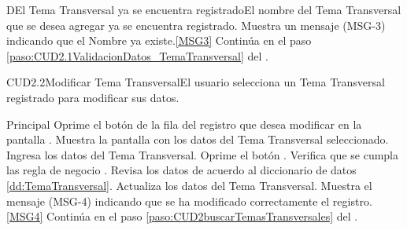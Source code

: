 		\begin{UCtrayectoriaA}{D}{El Tema Transversal ya se encuentra registrado}{El nombre del Tema Transversal que se desea agregar ya se encuentra registrado.}
			\UCpaso Muestra un mensaje (MSG-3) indicando que el Nombre ya existe.\ref{MSG3}
			\UCpaso Continúa en el paso \ref{paso:CUD2.1ValidacionDatos_TemaTransversal} del .
		\end{UCtrayectoriaA}


	\begin{UseCase}{CUD2.2}{Modificar Tema Transversal}{El usuario selecciona un Tema Transversal registrado para modificar sus datos.}
	\end{UseCase}

	\begin{UCtrayectoria}{Principal}			
			\UCpaso[\UCactor] Oprime el botón  de la fila del registro que desea modificar en la pantalla .	
			\UCpaso Muestra la pantalla  con los datos del Tema Transversal seleccionado.
                        \UCpaso [\UCactor] Ingresa los datos del Tema Transversal.\label{paso:CUD2.2ingresaDatosTemaTransversal}
			\UCpaso [\UCactor] Oprime el botón .
			\UCpaso Verifica que se cumpla las regla de negocio .  
			\UCpaso Revisa los datos de acuerdo al diccionario de datos \ref{dd:TemaTransversal}. 
			\UCpaso Actualiza los datos del Tema Transversal.
			\UCpaso Muestra el mensaje (MSG-4) indicando que se ha modificado correctamente el registro.\ref{MSG4}
			\UCpaso Continúa en el paso \ref{paso:CUD2buscarTemasTransversales} del .
	\end{UCtrayectoria}

